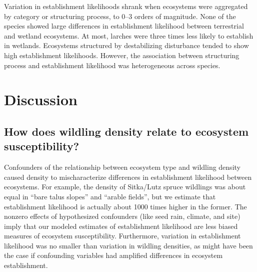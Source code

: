 \documentclass[
]{article}
\begin{document}
Variation in establishment likelihoods shrank when ecosystems were aggregated by
category or structuring process, to 0--3 orders of magnitude. None of the
species showed large differences in establishment likelihood between terrestrial
and wetland ecosystems. At most, larches were three times less likely to
establish in wetlands. Ecosystems structured by destabilizing disturbance tended
to show high establishment likelihoods. However, the association between
structuring process and establishment likelihood was heterogeneous across
species.

\section{Discussion}\label{discussion}

\subsection{How does wildling density relate to ecosystem susceptibility?}\label{how-does-wildling-density-relate-to-ecosystem-susceptibility}

Confounders of the relationship between ecosystem type and wildling density
caused density to mischaracterize differences in establishment likelihood
between ecosystems. For example, the density of Sitka/Lutz spruce wildlings was
about equal in ``bare talus slopes'' and ``arable fields'', but we estimate that
establishment likelihood is actually about 1000 times higher in the former. The
nonzero effects of hypothesized confounders (like seed rain, climate, and site)
imply that our modeled estimates of establishment likelihood are less biased
measures of ecosystem susceptibility. Furthermore, variation in establishment
likelihood was no smaller than variation in wildling densities, as might have
been the case if confounding variables had amplified differences in ecosystem
establishment.
\end{document}
